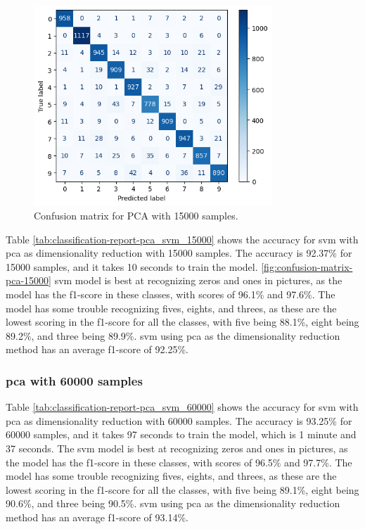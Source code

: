 \begin{figure}[htb!]
    \centering
    \includegraphics[width=0.8\textwidth]{figures/1-experiment/confusion_matrix_pca_svm_15000.png}
    \caption{Confusion matrix for PCA with 15000 samples.}
    \label{fig:confusion-matrix-pca-15000}
\end{figure}


Table \ref{tab:classification-report-pca_svm_15000} shows the accuracy for \gls{svm} with \gls{pca} as dimensionality reduction with 15000 samples. The accuracy is 92.37\% for 15000 samples, and it takes 10 seconds to train the model. \autoref{fig:confusion-matrix-pca-15000} \gls{svm} model is best at recognizing zeros and ones in pictures, as the model has the f1-score in these classes, with scores of 96.1\% and 97.6\%. The model has some trouble recognizing fives, eights, and threes, as these are the lowest scoring in the f1-score for all the classes, with five being 88.1\%, eight being 89.2\%, and three being 89.9\%. \gls{svm} using \gls{pca} as the dimensionality reduction method has an average f1-score of 92.25\%.

\subsubsection{\gls{pca} with 60000 samples}\label{subsubsec:experiment-1-results-pca-60000}



Table \ref{tab:classification-report-pca_svm_60000} shows the accuracy for \gls{svm} with \gls{pca} as dimensionality reduction with 60000 samples. The accuracy is 93.25\% for 60000 samples, and it takes 97 seconds to train the model, which is 1 minute and 37 seconds. The \gls{svm} model is best at recognizing zeros and ones in pictures, as the model has the f1-score in these classes, with scores of 96.5\% and 97.7\%. The model has some trouble recognizing fives, eights, and threes, as these are the lowest scoring in the f1-score for all the classes, with five being 89.1\%, eight being 90.6\%, and three being 90.5\%. \gls{svm} using \gls{pca} as the dimensionality reduction method has an average f1-score of 93.14\%.

